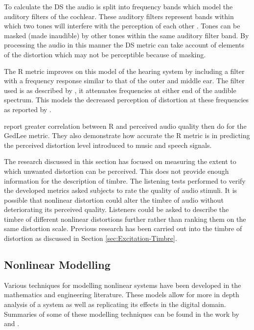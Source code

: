 		To calculate the DS the audio is split into frequency bands which model the auditory filters of the
		cochlear. These auditory filters represent bands within which two tones will interfere with the perception
		of each other \citep{fastl2007psychoacoustics}. Tones can be masked (made inaudible) by other tones within
		the same auditory filter band. By processing the audio in this manner the DS metric can take account of
		elements of the distortion which may not be perceptible because of masking.
		
		The R metric improves on this model of the hearing system by including a filter with a
		frequency response similar to that of the outer and middle ear. The filter used is as described by
		\citet{glasberg2002a}, it attenuates frequencies at either end of the audible spectrum. This models the
		decreased perception of distortion at these frequencies as reported by \citet{voishvillo2006assessment}.

		\citet{tan2004predicting} report greater correlation between R and perceived audio quality then
		\citet{lee2003auditory} do for the GedLee metric. They also demonstrate how accurate the R
		metric is in predicting the perceived distortion level introduced to music and speech signals.

		The research discussed in this section has focused on measuring the extent to which unwanted distortion can
		be perceived. This does not provide enough information for the description of timbre. The listening tests
		performed to verify the developed metrics asked subjects to rate the quality of audio stimuli. It is
		possible that nonlinear distortion could alter the timbre of audio without deteriorating its perceived
		quality. Listeners could be asked to describe the timbre of different nonlinear distortions further rather
		than ranking them on the same distortion scale. Previous research has been carried out into the timbre of
		distortion as discussed in Section \ref{sec:Excitation-Timbre}.

	\subsection{Nonlinear Modelling}
	\label{sec:Excitation-Analysis-Modelling}
		Various techniques for modelling nonlinear systems have been developed in the mathematics and engineering
		literature. These models allow for more in depth analysis of a system as well as replicating its effects in
		the digital domain. Summaries of some of these modelling techniques can be found in the work by
		\citet{janczak2005identification} and \citet{ogunfunmi2007adaptive}.

